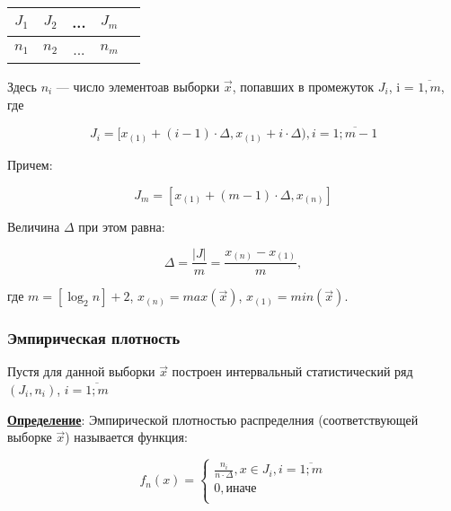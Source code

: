 \begin{table}[htb]
    \centering
    \begin{tabular}{|c|c|c|c|c|}
        \hline
        $J_1$ & $J_2$ & ... & $J_m$ \\
        \hline
        $n_1$ & $n_2$ & ... & $n_m$ \\
        \hline
    \end{tabular}
\end{table}

Здесь $n_i$ --- число элементоав выборки $\vec x$, попавших в промежуток $J_i$, i = $\overline{1, m}$, где

\begin{equation}
    J_i = [x_{(1)} + (i - 1) \cdot \Delta, x_{(1)} + i \cdot \Delta), i = \overline{1; m - 1}
\end{equation}

Причем:

\begin{equation}
    J_{m} = [x_{(1)} + (m - 1) \cdot \Delta, x_{(n)}]
\end{equation}

Величина $\Delta$ при этом равна:

\begin{equation}
    \Delta = \frac{|J|}{m} = \frac{x_{(n)} - x_{(1)}}{m},
\end{equation}

где $m = [\log_2 n] + 2$, $x_{(n)} = max(\vec x)$, $x_{(1)} = min(\vec x)$.



\subsubsection{Эмпирическая плотность}

Пустя для данной выборки $\vec x$ построен интервальный статистический ряд $(J_i, n_i)$, $i = \overline{1; m}$\newline

\textbf{\underline{Определение}}: Эмпирической плотностью распределния (соответствующей выборке $\vec x$) называется функция:

\begin{equation}
    f_n(x) =
    \begin{cases}
        \frac{n_i}{n \cdot \Delta}, x \in J_i, i = \overline{1; m} \\
        0, \text{иначе} \\
    \end{cases}
\end{equation}


